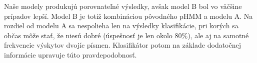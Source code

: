 Naše modely produkujú porovnateľné výsledky, avšak model B bol vo väčšine prípadov lepší. Model B je totiž kombináciou pôvodného pHMM a modelu A. Na rozdiel od modelu A sa nespolieha len na výsledky klasifikácie, pri korých sa občas môže stať, že niesú dobré (úspešnosť je len okolo 80\%), ale aj na samotné frekvencie výskytov dvojíc písmen. Klasifikátor potom na základe dodatočnej informácie upravuje túto pravdepodobnosť.







